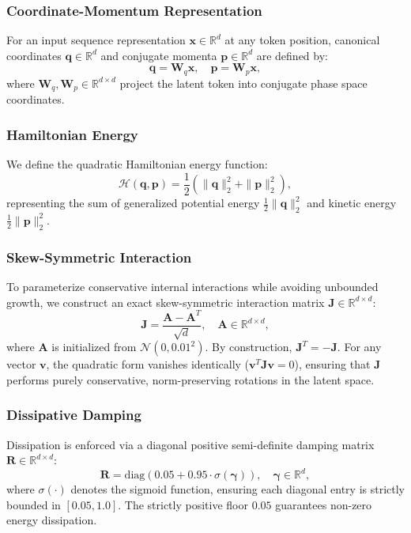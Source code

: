 \documentclass[10pt,journal,final]{IEEEtran}
\begin{document}
\subsubsection{Coordinate-Momentum Representation}
For an input sequence representation $\mathbf{x} \in \mathbb{R}^d$ at any token position, canonical coordinates $\mathbf{q} \in \mathbb{R}^d$ and conjugate momenta $\mathbf{p} \in \mathbb{R}^d$ are defined by:
\begin{equation}
\label{eq:hedo_qp}
\mathbf{q} = \mathbf{W}_q \mathbf{x}, \quad \mathbf{p} = \mathbf{W}_p \mathbf{x},
\end{equation}
where $\mathbf{W}_q, \mathbf{W}_p \in \mathbb{R}^{d \times d}$ project the latent token into conjugate phase space coordinates.

\subsubsection{Hamiltonian Energy}
We define the quadratic Hamiltonian energy function:
\begin{equation}
\label{eq:hamiltonian}
\mathcal{H}(\mathbf{q}, \mathbf{p}) = \frac{1}{2} \left( \|\mathbf{q}\|_2^2 + \|\mathbf{p}\|_2^2 \right),
\end{equation}
representing the sum of generalized potential energy $\frac{1}{2}\|\mathbf{q}\|_2^2$ and kinetic energy $\frac{1}{2}\|\mathbf{p}\|_2^2$.

\subsubsection{Skew-Symmetric Interaction}
To parameterize conservative internal interactions while avoiding unbounded growth, we construct an exact skew-symmetric interaction matrix $\mathbf{J} \in \mathbb{R}^{d \times d}$:
\begin{equation}
\label{eq:skew_symmetric}
\mathbf{J} = \frac{\mathbf{A} - \mathbf{A}^T}{\sqrt{d}}, \quad \mathbf{A} \in \mathbb{R}^{d \times d},
\end{equation}
where $\mathbf{A}$ is initialized from $\mathcal{N}(0, 0.01^2)$. By construction, $\mathbf{J}^T = -\mathbf{J}$. For any vector $\mathbf{v}$, the quadratic form vanishes identically ($\mathbf{v}^T \mathbf{J} \mathbf{v} = 0$), ensuring that $\mathbf{J}$ performs purely conservative, norm-preserving rotations in the latent space.

\subsubsection{Dissipative Damping}
Dissipation is enforced via a diagonal positive semi-definite damping matrix $\mathbf{R} \in \mathbb{R}^{d \times d}$:
\begin{equation}
\label{eq:damping_matrix}
\mathbf{R} = \mathrm{diag}\left( 0.05 + 0.95 \cdot \sigma(\boldsymbol{\gamma}) \right), \quad \boldsymbol{\gamma} \in \mathbb{R}^d,
\end{equation}
where $\sigma(\cdot)$ denotes the sigmoid function, ensuring each diagonal entry is strictly bounded in $[0.05, 1.0]$. The strictly positive floor $0.05$ guarantees non-zero energy dissipation.
\end{document}
